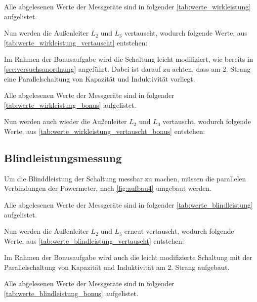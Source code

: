\documentclass[12pt,english,ngerman]{scrartcl}
\begin{document}
Alle abgelesenen Werte der Messgeräte sind in folgender \autoref{tab:werte_wirkleistung} aufgelistet.


Nun werden die Außenleiter $L_2$ und $L_3$ vertauscht, wodurch folgende Werte, aus \autoref{tab:werte_wirkleistung_vertauscht} entstehen:


Im Rahmen der Bonusaufgabe wird die Schaltung leicht modifiziert, wie bereits in \autoref{sec:versuchsanordnung} angeführt.
Dabei ist darauf zu achten, dass am 2. Strang eine Parallelschaltung von Kapazität und Induktivität vorliegt.

Alle abgelesenen Werte der Messgeräte sind in folgender \autoref{tab:werte_wirkleistung_bonus} aufgelistet.


Nun werden auch wieder die Außenleiter $L_2$ und $L_3$ vertauscht, wodurch folgende Werte, aus \autoref{tab:werte_wirkleistung_vertauscht_bonus} entstehen:


\subsection{Blindleistungsmessung}

Um die Blinddleistung der Schaltung messbar zu machen, müssen die parallelen Verbindungen der Powermeter, nach
\autoref{fig:aufbau4} umgebaut werden.

Alle abgelesenen Werte der Messgeräte sind in folgender \autoref{tab:werte_blindleistung} aufgelistet.


Nun werden die Außenleiter $L_2$ und $L_3$ erneut vertauscht, wodurch folgende Werte, aus \autoref{tab:werte_blindleistung_vertauscht} entstehen:


Im Rahmen der Bonusaufgabe wird auch die leicht modifizierte Schaltung mit der Parallelschaltung von Kapazität und Induktivität am 2. Strang aufgebaut.

Alle abgelesenen Werte der Messgeräte sind in folgender \autoref{tab:werte_blindleistung_bonus} aufgelistet.

\end{document}
